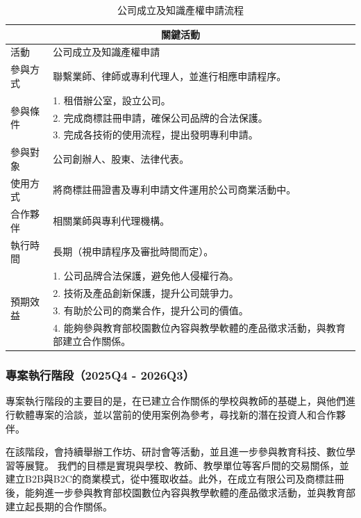 \begin{table}[H]
  \centering
  \caption{公司成立及知識產權申請流程}
  \begin{tabular}{|l|l|}
      \hline
      \multicolumn{2}{|c|}{\textbf{關鍵活動}} \\ \hline
      活動 & 公司成立及知識產權申請 \\ \hline
      參與方式 & 聯繫業師、律師或專利代理人，並進行相應申請程序。 \\ \hline
      \multirow{3}{*}{參與條件}
      & 1. 租借辦公室，設立公司。 \\
      & 2. 完成商標註冊申請，確保公司品牌的合法保護。 \\
      & 3. 完成各技術的使用流程，提出發明專利申請。 \\ \hline
      參與對象 & 公司創辦人、股東、法律代表。 \\ \hline
      使用方式 & 將商標註冊證書及專利申請文件運用於公司商業活動中。 \\ \hline
      合作夥伴 & 相關業師與專利代理機構。 \\ \hline
      執行時間 & 長期（視申請程序及審批時間而定）。 \\ \hline
      \multirow{4}{*}{預期效益}
      & 1. 公司品牌合法保護，避免他人侵權行為。 \\
      & 2. 技術及產品創新保護，提升公司競爭力。 \\
      & 3. 有助於公司的商業合作，提升公司的價值。 \\ 
      & 4. 能夠參與教育部校園數位內容與教學軟體的產品徵求活動，與教育部建立合作關係。 \\ \hline
  \end{tabular}
\end{table}

\subsubsection{專案執行階段（2025Q4 - 2026Q3）}

專案執行階段的主要目的是，在已建立合作關係的學校與教師的基礎上，與他們進行軟體專案的洽談，並以當前的使用案例為參考，尋找新的潛在投資人和合作夥伴。

在該階段，會持續舉辦工作坊、研討會等活動，並且進一步參與教育科技、數位學習等展覽。
我們的目標是實現與學校、教師、教學單位等客戶間的交易關係，並建立B2B與B2C的商業模式，從中獲取收益。此外，在成立有限公司及商標註冊後，能夠進一步參與教育部校園數位內容與教學軟體的產品徵求活動，並與教育部建立起長期的合作關係。

